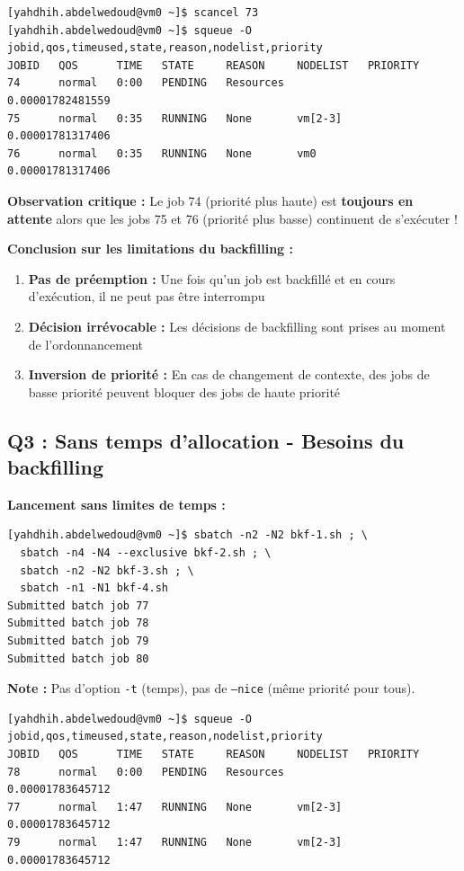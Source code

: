 \documentclass[12pt,a4paper]{article}
\newcommand{\code}[1]{\texttt{#1}}
\begin{document}
\begin{lstlisting}
[yahdhih.abdelwedoud@vm0 ~]$ scancel 73
[yahdhih.abdelwedoud@vm0 ~]$ squeue -O jobid,qos,timeused,state,reason,nodelist,priority
JOBID   QOS      TIME   STATE     REASON     NODELIST   PRIORITY            
74      normal   0:00   PENDING   Resources             0.00001782481559    
75      normal   0:35   RUNNING   None       vm[2-3]    0.00001781317406    
76      normal   0:35   RUNNING   None       vm0        0.00001781317406    
\end{lstlisting}

\textbf{Observation critique :} Le job 74 (priorité plus haute) est \textbf{toujours en attente} alors que les jobs 75 et 76 (priorité plus basse) continuent de s'exécuter !

\textbf{Conclusion sur les limitations du backfilling :}
\begin{enumerate}
    \item \textbf{Pas de préemption :} Une fois qu'un job est backfillé et en cours d'exécution, il ne peut pas être interrompu
    \item \textbf{Décision irrévocable :} Les décisions de backfilling sont prises au moment de l'ordonnancement
    \item \textbf{Inversion de priorité :} En cas de changement de contexte, des jobs de basse priorité peuvent bloquer des jobs de haute priorité
\end{enumerate}

\subsection{Q3 : Sans temps d'allocation - Besoins du backfilling}

\textbf{Lancement sans limites de temps :}
\begin{lstlisting}
[yahdhih.abdelwedoud@vm0 ~]$ sbatch -n2 -N2 bkf-1.sh ; \
  sbatch -n4 -N4 --exclusive bkf-2.sh ; \
  sbatch -n2 -N2 bkf-3.sh ; \
  sbatch -n1 -N1 bkf-4.sh 
Submitted batch job 77
Submitted batch job 78
Submitted batch job 79
Submitted batch job 80
\end{lstlisting}

\textbf{Note :} Pas d'option \code{-t} (temps), pas de \code{--nice} (même priorité pour tous).

\begin{lstlisting}
[yahdhih.abdelwedoud@vm0 ~]$ squeue -O jobid,qos,timeused,state,reason,nodelist,priority
JOBID   QOS      TIME   STATE     REASON     NODELIST   PRIORITY            
78      normal   0:00   PENDING   Resources             0.00001783645712    
77      normal   1:47   RUNNING   None       vm[2-3]    0.00001783645712    
79      normal   1:47   RUNNING   None       vm[2-3]    0.00001783645712    
\end{lstlisting}
\end{document}
